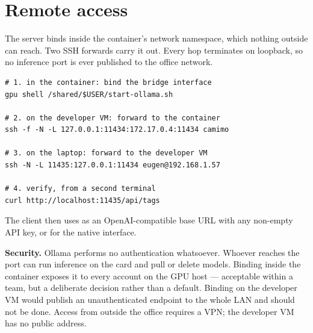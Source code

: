 \section{Remote access}
\label{sec:remote-access}

The server binds inside the container's network namespace, which nothing
outside can reach. Two SSH forwards carry it out. Every hop terminates on
loopback, so no inference port is ever published to the office network.

\begin{lstlisting}
# 1. in the container: bind the bridge interface
gpu shell /shared/$USER/start-ollama.sh

# 2. on the developer VM: forward to the container
ssh -f -N -L 127.0.0.1:11434:172.17.0.4:11434 camimo

# 3. on the laptop: forward to the developer VM
ssh -N -L 11435:127.0.0.1:11434 eugen@192.168.1.57

# 4. verify, from a second terminal
curl http://localhost:11435/api/tags
\end{lstlisting}

The client then uses  as an OpenAI-compatible
base URL with any non-empty API key, or  for the native
interface.

\medskip
\textbf{Security.} Ollama performs no authentication whatsoever. Whoever reaches
the port can run inference on the card and pull or delete models. Binding
 inside the container exposes it to every account on the GPU host
--- acceptable within a team, but a deliberate decision rather than a default.
Binding  on the developer VM would publish an unauthenticated
endpoint to the whole LAN and should not be done. Access from outside the
office requires a VPN; the developer VM has no public address.

